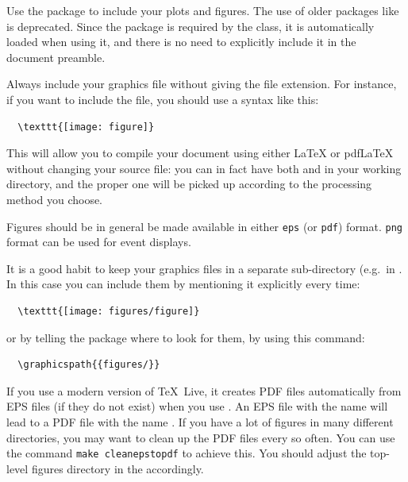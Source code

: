 Use the  package to include your plots and figures. 
The use of older packages like  is deprecated.
Since the  package is required by the 
class, it is automatically loaded when using it, and there is no need
to explicitly include it in the document preamble.

Always include your graphics file without giving the file extension.
For instance, if you want to include the 
file, you should use a syntax like this:
\begin{verbatim}
  \texttt{[image: figure]}
\end{verbatim}
This will allow you to compile your document using either \LaTeX{} or
pdf\LaTeX{} without changing your source file: you can in fact have
both  and  in your working directory,
and the proper one will be picked up according to the processing method
you choose.

Figures should be in general be made available in either \texttt{eps} (or \texttt{pdf}) format.
\texttt{png} format can be used for event displays.

It is a good habit to keep your graphics files in a separate
sub-directory (e.g.\ in . 
In this case you can include them by mentioning it explicitly every time:
\begin{verbatim}
  \texttt{[image: figures/figure]}
\end{verbatim}
or by telling the  package where to look
for them, by using this command:
\begin{verbatim}
  \graphicspath{{figures/}}
\end{verbatim}

If you use a modern version of \TeX\ Live, it creates PDF files automatically from EPS files
(if they do not exist) when you use .
An EPS file with the name  will lead to a PDF file with the name
.
If you have a lot of figures in many different directories, you may want to clean up the PDF files every so often.
You can use the command \verb|make cleanepstopdf| to achieve this.
You should adjust the top-level figures directory in the  accordingly.


